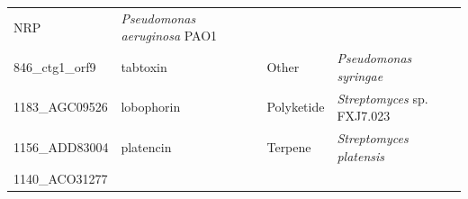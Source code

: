 \documentclass[12pt,twoside]{reedthesis}
\begin{document}
\begin{longtable}[]{@{}llll@{}}
\begin{minipage}[t]{0.15\columnwidth}
  NRP\strut
  \end{minipage} & \begin{minipage}[t]{0.34\columnwidth}\raggedright\strut
  \emph{Pseudomonas aeruginosa} PAO1\strut
  \end{minipage}\tabularnewline
  \begin{minipage}[t]{0.19\columnwidth}\raggedright\strut
  846\_ctg1\_orf9\strut
  \end{minipage} & \begin{minipage}[t]{0.20\columnwidth}\raggedright\strut
  tabtoxin\strut
  \end{minipage} & \begin{minipage}[t]{0.15\columnwidth}\raggedright\strut
  Other\strut
  \end{minipage} & \begin{minipage}[t]{0.34\columnwidth}\raggedright\strut
  \emph{Pseudomonas syringae}\strut
  \end{minipage}\tabularnewline
  \begin{minipage}[t]{0.19\columnwidth}\raggedright\strut
  1183\_AGC09526\strut
  \end{minipage} & \begin{minipage}[t]{0.20\columnwidth}\raggedright\strut
  lobophorin\strut
  \end{minipage} & \begin{minipage}[t]{0.15\columnwidth}\raggedright\strut
  Polyketide\strut
  \end{minipage} & \begin{minipage}[t]{0.34\columnwidth}\raggedright\strut
  \emph{Streptomyces} sp. FXJ7.023\strut
  \end{minipage}\tabularnewline
  \begin{minipage}[t]{0.19\columnwidth}\raggedright\strut
  1156\_ADD83004\strut
  \end{minipage} & \begin{minipage}[t]{0.20\columnwidth}\raggedright\strut
  platencin\strut
  \end{minipage} & \begin{minipage}[t]{0.15\columnwidth}\raggedright\strut
  Terpene\strut
  \end{minipage} & \begin{minipage}[t]{0.34\columnwidth}\raggedright\strut
  \emph{Streptomyces platensis}\strut
  \end{minipage}\tabularnewline
  \begin{minipage}[t]{0.19\columnwidth}\raggedright\strut
  1140\_ACO31277\strut
  \end{minipage} & \begin{minipage}[t]{0.20\columnwidth}\raggedright\strut

\end{minipage}
\end{longtable}
\end{document}
